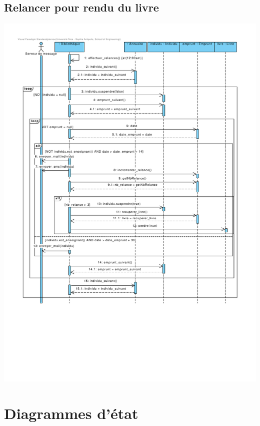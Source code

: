 \documentclass{article}
\begin{document}
\subsection{Relancer pour rendu du livre}
\vspace{-4em}
\hspace*{-9em}\includegraphics[scale=1.5]{sequence_relancer_pour_rendu_du_livre}
\vspace*{-4em}


\section{Diagrammes d'état}
\end{document}
